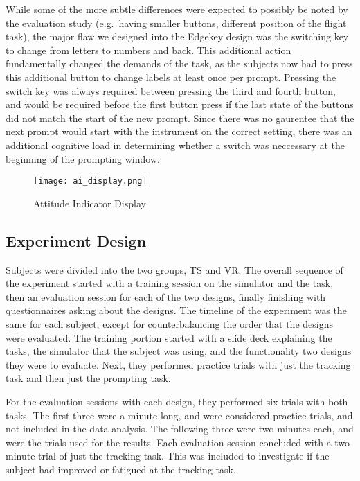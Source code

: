 While some of the more subtle differences were expected to possibly be noted by the evaluation study (e.g.\ having smaller buttons, different position of the flight task), the major flaw we designed into the Edgekey design was the switching key to change from letters to numbers and back.
This additional action fundamentally changed the demands of the task, as the subjects now had to press this additional button to change labels at least once per prompt.
Pressing the switch key was always required between pressing the third and fourth button, and would be required before the first button press if the last state of the buttons did not match the start of the new prompt.
Since there was no gaurentee that the next prompt would start with the instrument on the correct setting, there was an additional cognitive load in determining whether a switch was neccessary at the beginning of the prompting window.

\begin{figure}
    \texttt{[image: ai\_display.png]}
    \caption{Attitude Indicator Display}
    \label{fig:de_ai_display}
\end{figure}

\subsection{Experiment Design}

Subjects were divided into the two groups, TS and VR.
The overall sequence of the experiment started with a training session on the simulator and the task, then an evaluation session for each of the two designs, finally finishing with questionnaires asking about the designs.
The timeline of the experiment was the same for each subject, except for counterbalancing the order that the designs were evaluated.
The training portion started with a slide deck explaining the tasks, the simulator that the subject was using, and the functionality two designs they were to evaluate.
Next, they performed practice trials with just the tracking task and then just the prompting task.

For the evaluation sessions with each design, they performed six trials with both tasks.
The first three were a minute long, and were considered practice trials, and not included in the data analysis.
The following three were two minutes each, and were the trials used for the results.
Each evaluation session concluded with a two minute trial of just the tracking task.
This was included to investigate if the subject had improved or fatigued at the tracking task.

